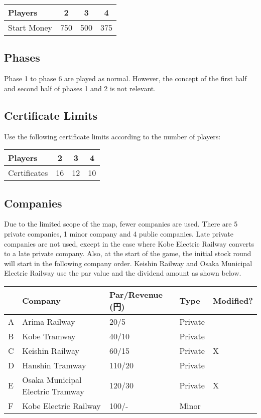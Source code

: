 \documentclass{article}
\begin{document}
\begin{CJK}{UTF8}{min}
\begin{multicols}{2}
\begin{tabular}{|l|c|c|c|}
\hline
Players & 2 & 3 & 4 \\
\hline
Start Money & 750 & 500 & 375 \\
\hline
\end{tabular}

\subsection{Phases}
Phase 1 to phase 6 are played as normal. However, the concept of the
first half and second half of phases 1 and 2 is not relevant.

\subsection{Certificate Limits}
Use the following certificate limits according to the number of players:

\begin{tabular}{|l|c|c|c|}
\hline
Players & 2 & 3 & 4 \\
\hline
Certificates & 16 & 12 & 10 \\
\hline
\end{tabular}

\subsection{Companies}
Due to the limited scope of the map, fewer companies are used. There
are 5 private companies, 1 minor company and 4 public companies. Late
private companies are not used, except in the case where Kobe Electric
Railway converts to a late private company. Also, at the start of the
game, the initial stock round will start in the following company
order. Keishin Railway and Osaka Municipal Electric Railway use the par
value and the dividend amount as shown below.

\begin{table*}
\begin{tabular}{lllll}
 & Company & Par/Revenue (円) & Type & Modified? \\
\hline
A & Arima Railway & 20/5 & Private & \\
B & Kobe Tramway & 40/10 & Private & \\
C & Keishin Railway & 60/15 & Private & X \\
D & Hanshin Tramway & 110/20 & Private & \\
E & Osaka Municipal Electric Tramway & 120/30 & Private  & X \\
F & Kobe Electric Railway & 100/- & Minor  & \\
\end{tabular}
\end{table*}


\end{multicols}
\end{CJK}
\end{document}
